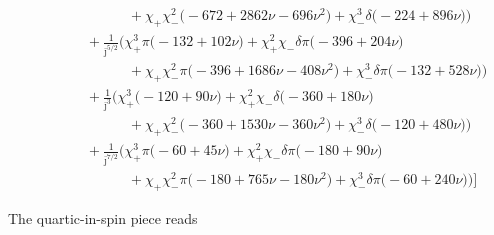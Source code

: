 \documentclass[prd,superscriptaddress,preprintnumbers,tightenlines,nofootinbib, eqsecnum]{revtex4-2}
\newcommand{\nn}{\nonumber}
\begin{document}
\begin{align}
&\qquad\qquad\qquad + \chi_{+}\chi_{-}^{2}\bigg(-672 + 2862 \nu - 696 \nu^{2}\bigg)  + \chi_{-}^{3}\delta\bigg(-224 + 896 \nu\bigg)\Bigg) \nn \\
&\qquad\quad + \frac{1}{\bar{\jmath}^{5/2}}\Bigg(\chi_{+}^{3}\pi\bigg(-132 + 102 \nu\bigg) + \chi_{+}^{2}\chi_{-}\delta\pi\bigg(-396 + 204 \nu\bigg) \nn \\
&\qquad\qquad\qquad + \chi_{+}\chi_{-}^{2}\pi\bigg(-396 + 1686 \nu - 408 \nu^{2}\bigg) + \chi_{-}^{3}\delta\pi\bigg(-132 + 528 \nu\bigg)\Bigg) \nn \\
&\qquad\quad + \frac{1}{\bar{\jmath}^{3}}\Bigg(\chi_{+}^{3}\bigg(-120 + 90 \nu\bigg) + \chi_{+}^{2}\chi_{-}\delta\bigg(-360 + 180 \nu\bigg)\nn \\
&\qquad\qquad\qquad   + \chi_{+}\chi_{-}^{2}\bigg(-360 + 1530 \nu - 360 \nu^{2}\bigg)  + \chi_{-}^{3}\delta\bigg(-120 + 480 \nu\bigg)\Bigg) \nn \\
&\qquad\quad + \frac{1}{\bar{\jmath}^{7/2}}\Bigg(\chi_{+}^{3}\pi\bigg(-60 + 45 \nu\bigg) + \chi_{+}^{2}\chi_{-}\delta\pi\bigg(-180 + 90 \nu\bigg) \nn \\
&\qquad\qquad\qquad + \chi_{+}\chi_{-}^{2}\pi\bigg(-180 + 765 \nu - 180 \nu^{2}\bigg)   + \chi_{-}^{3}\delta\pi\bigg(-60 + 240 \nu\bigg)\Bigg)\Bigg]
\end{align}


The quartic-in-spin piece reads
\end{document}

